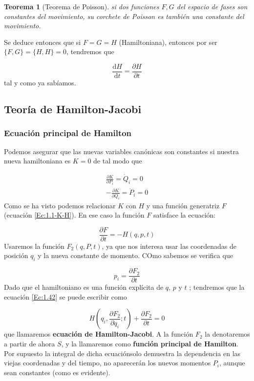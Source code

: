 \documentclass[12pt,a4paper]{article}
\numberwithin{equation}{section}
\numberwithin{figure}{section}
\newcommand{\parentesis}[1]{\left( #1  \right)}
\newcommand{\parciales}[2]{\frac{\partial #1}{\partial #2}}
\newcommand{\D}{\mathrm{d}}
\newcommand{\derivadas}[2]{\frac{\D #1}{\D #2}}
\newtheorem{theorem}{Teorema}[section]
\begin{document}
\begin{theorem}[Teorema de Poisson]
si dos funciones $F,G$ del espacio de fases son constantes del movimiento, su corchete de Poisson es también una constante del movimiento.
\end{theorem}

Se deduce entonces que si $F=G=H$ (Hamiltoniana), entonces por ser $\{ F, G \} = \{ H, H \} = 0$, tendremos que 

\begin{equation}
\derivadas{H}{t} = \parciales{H}{t}
\end{equation}
tal y como ya sabíamos.


\subsection{Teoría de Hamilton-Jacobi}

\subsubsection{Ecuación principal de Hamilton}

Podemos asegurar que las nuevas variables canónicas son constantes si nuestra nueva hamiltoniana es $K=0$ de tal modo que

\begin{eqnarray}
\parciales{K}{P_i}  = \dot{Q}_i = 0 \\
- \parciales{K}{Q_i}  =  \dot{P}_i = 0
\end{eqnarray}
Como se ha visto podemos relacionar $K$ con $H$ y una función generatriz $F$ (ecuación \ref{Ec:1.1-K-H}). En ese caso la función $F$ satisface la ecuación:

\begin{equation}
\parciales{F}{t} = - H (q,p,t) \label{Ec:1.42}
\end{equation}
Usaremos la función $F_2(q,P,t)$, ya que nos interesa usar las coordenadas de posición $q_i$ y la nueva constante de momento. COmo sabemos se verifica que

$$ p_i = \parciales{F_2}{t} $$
Dado que el hamiltoniano es una función explícita de $q$, $p$ y $t$ ; tendremos que la ecuación \ref{Ec:1.42} se puede escribir como 

\begin{equation}
H \parentesis{q_i, \parciales{F_2}{q_i};t} + \parciales{F_2}{t} = 0
\end{equation}
que llamaremos \textbf{ecuación de Hamilton-Jacobi}. A la función $F_2$ la denotaremos a partir de ahora $S$, y la llamaremos como \textbf{función principal de Hamilton}. Por supuesto la integral de dicha ecuaciónsolo demuestra la dependencia en las  viejas coordenadas y del tiempo, no aparecerán los nuevos momentos $P_i$, aunque sean constantes (como es evidente). \\
\end{document}
